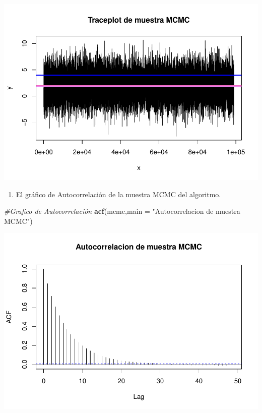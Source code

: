 \documentclass[
]{article}
\newenvironment{Shaded}{\begin{snugshade}}{\end{snugshade}}
\newcommand{\AttributeTok}[1]{\textcolor[rgb]{0.13,0.29,0.53}{#1}}
\newcommand{\CommentTok}[1]{\textcolor[rgb]{0.56,0.35,0.01}{\textit{#1}}}
\newcommand{\FunctionTok}[1]{\textcolor[rgb]{0.13,0.29,0.53}{\textbf{#1}}}
\newcommand{\NormalTok}[1]{#1}
\newcommand{\StringTok}[1]{\textcolor[rgb]{0.31,0.60,0.02}{#1}}
\providecommand{\tightlist}{%
  \setlength{\itemsep}{0pt}\setlength{\parskip}{0pt}}
\begin{document}
\includegraphics{tarea2_files/figure-latex/unnamed-chunk-15-1.pdf}

\begin{enumerate}
\def\labelenumi{\alph{enumi}.}
\setcounter{enumi}{4}
\tightlist
\item
  El gráfico de Autocorrelación de la muestra MCMC del algoritmo.
\end{enumerate}

\begin{Shaded}
\begin{Highlighting}[]
\CommentTok{\#Grafico de Autocorrelación}
\FunctionTok{acf}\NormalTok{(mcmc,}\AttributeTok{main =} \StringTok{"Autocorrelacion de muestra MCMC"}\NormalTok{)}
\end{Highlighting}
\end{Shaded}

\includegraphics{tarea2_files/figure-latex/unnamed-chunk-16-1.pdf}
\end{document}

